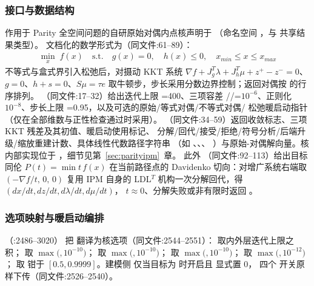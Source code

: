 \subsubsection*{接口与数据结构}
作用于 Parity 全空间问题的自研原始对偶内点核声明于
（命名空间
，与  共享结果类型）。
文档化的数学形式为（同文件:61--89）：
\begin{align*}
\min_x\; f(x)\quad \text{s.t.}\quad g(x)=0,\quad h(x)\le 0,\quad x_{min}\le x\le x_{max}
\end{align*}
不等式与盒式界引入松弛后，对摄动 KKT 系统
$\nabla f+J_g^{T}\lambda+J_h^{T}\mu+z^{+}-z^{-}=0$、$g=0$、$h+s=0$、$S\mu=\tau e$
取牛顿步，步长采用分数边界控制；返回对偶按  的行序排列。
（同文件:17--32）给出迭代上限 =400、三项容差
//=$10^{-6}$、正则化
$10^{-8}$、步长上限 =0.95，以及可选的原始/等式对偶/不等式对偶/
松弛暖启动指针（仅在全部维数与正性检查通过时采用）。
（同文件:34--59）返回收敛标志、三项 KKT 残差及其初值、暖启动使用标记、
分解/回代/接受/拒绝/符号分析/后端升级/缩放重建计数、具体线性代数路径字符串
（如 、、、
）与原始-对偶解向量。核内部实现位于
，细节见第~\ref{sec:parityipm}~章。
此外 （同文件:92--113）给出目标同伦 $P(t)=\min t\,f(x)$
在当前路径点的 Davidenko 切向：对增广系统右端取 $(-\nabla f/t,\,0,\,0)$ 复用
IPM 自身的 LDL$^{T}$ 机构一次分解回代，得 $(dx/dt,dz/dt,d\lambda/dt,d\mu/dt)$，
$t\approx0$、分解失败或非有限时返回 。

\subsubsection*{选项映射与暖启动编排}
（:2486--3020）
把  翻译为核选项（同文件:2544--2551）：
 取内外层迭代上限之积； 取
$\max($$,10^{-10})$； 取
$\max($$,10^{-10})$； 取
$\max($$,10^{-10})$； 取
$\max($$,10^{-12})$； 取
 钳于 $[0.5,0.9999]$。建模侧
 仅当目标为  时开启且  显式置 0，
四个  开关原样下传（同文件:2526--2540）。

